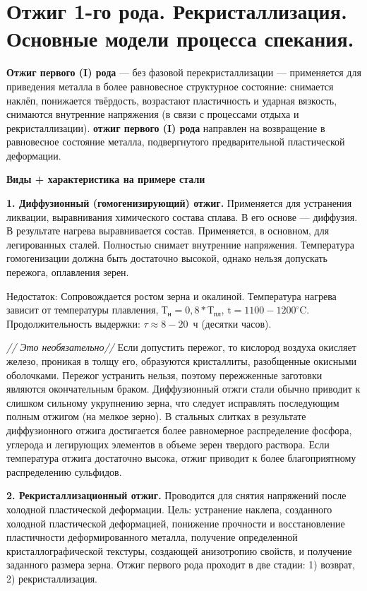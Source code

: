 \section{Отжиг 1-го рода. Рекристаллизация. Основные модели процесса спекания.}

\textbf{Отжиг первого (I) рода} --- без фазовой перекристаллизации --- применяется для приведения металла в более равновесное структурное состояние: снимается наклёп, понижается твёрдость, возрастают пластичность и ударная вязкость, снимаются внутренние напряжения (в связи с процессами отдыха и рекристаллизации). \textbf{отжиг первого (I) рода} направлен на возвращение в равновесное состояние металла, подвергнутого предварительной пластической деформации.

\textbf{Виды + характеристика на примере стали}



 \textbf{1. Диффузионный (гомогенизирующий) отжиг.} Применяется для устранения ликвации, выравнивания химического состава сплава. В его основе --- диффузия. В результате нагрева выравнивается состав. Применяется, в основном, для легированных сталей. Полностью снимает внутренние напряжения. Температура гомогенизации должна быть достаточно высокой, однако нельзя допускать пережога, оплавления зерен.

Недостаток: Сопровождается ростом зерна и окалиной. Температура нагрева зависит от температуры плавления, $\text{Т}_\text{н}=0,8* \text{Т}_\text{пл}$, $\mathrm{t}=1100-1200^{\circ} \mathrm{C}$. Продолжительность выдержки: $\tau \approx 8-20$~ч (десятки часов).

\textit{// Это необязательно//} Если допустить пережог, то кислород воздуха окисляет железо, проникая в толщу его, образуются кристаллиты, разобщенные окисными оболочками. Пережог устранить нельзя, поэтому пережженные заготовки являются окончательным браком. Диффузионный отжги стали обычно приводит к слишком сильному укрупнению зерна, что следует исправлять последующим полным отжигом (на мелкое зерно). В стальных слитках в результате диффузионного отжига достигается более равномерное распределение фосфора, углерода и легирующих элементов в объеме зерен твердого раствора. Если температура отжига достаточно высока, отжиг приводит к более благоприятному распределению сульфидов.

\textbf{2. Рекристаллизационный отжиг.} Проводится для снятия напряжений после холодной пластической деформации. Цель: устранение наклепа, созданного холодной пластической деформацией, понижение прочности и восстановление пластичности деформированного металла, получение определенной кристаллографической текстуры, создающей анизотропию свойств, и получение заданного размера зерна. Отжиг первого рода проходит в две стадии: 1) возврат, 2) рекристаллизация.

